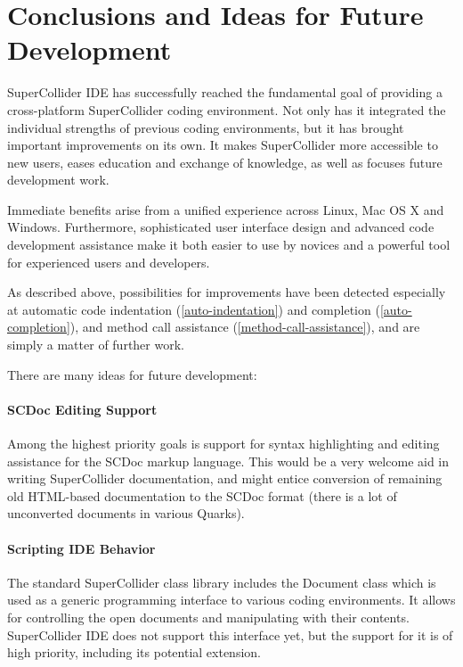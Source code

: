 \documentclass[11pt,a4paper]{article}
\begin{document}
\section{Conclusions and Ideas for Future Development}

SuperCollider IDE has successfully reached the fundamental goal of providing a cross-platform SuperCollider coding
environment. Not only has it integrated the individual strengths of previous coding environments, but it has brought
important improvements on its own. It makes SuperCollider more accessible to new users, eases education and exchange of
knowledge, as well as focuses future development work.

Immediate benefits arise from a unified experience across Linux, Mac OS X and Windows. Furthermore, sophisticated user
interface design and advanced code development assistance make it both easier to use by novices and a powerful tool for
experienced users and developers.

As described above, possibilities for improvements have been detected especially at automatic code indentation
(\ref{auto-indentation}) and completion (\ref{auto-completion}), and method call assistance
(\ref{method-call-assistance}), and are simply a matter of further work.

There are many ideas for future development:

\paragraph{SCDoc Editing Support} \hfill

Among the highest priority goals is support for syntax highlighting and editing assistance for the SCDoc markup
language. This would be a very welcome aid in writing SuperCollider documentation, and might entice conversion of
remaining old HTML-based documentation to the SCDoc format (there is a lot of unconverted documents in various Quarks).

\paragraph{Scripting IDE Behavior} \hfill

The standard SuperCollider class library includes the Document class which is used as a generic programming interface to
various coding environments. It allows for controlling the open documents and manipulating with their contents.
SuperCollider IDE does not support this interface yet, but the support for it is of high priority, including its
potential extension.
\end{document}
